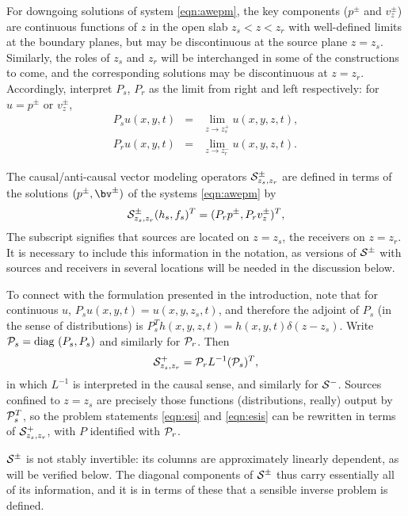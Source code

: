For downgoing solutions of system \ref{eqn:awepm}, the key
components ($p^{\pm}$ and $v^{\pm}_z$) are continuous functions of $z$
in the open slab $z_s<z<z_r$ with well-defined limits at the boundary
planes, but may be discontinuous at the source plane
$z=z_s$. Similarly, the roles of $z_s$ and $z_r$ will be interchanged
in some of the constructions to come, and the corresponding solutions
may be discontinuous at $z=z_r$. Accordingly, interpret $P_s$, $P_r$
as the limit from right and left respectively: for $u=p^{\pm}$ or
$v^{\pm}_z$,
\begin{eqnarray}
  \label{eqn:defsamp}
  P_su(x,y,t) &=& \lim_{z \rightarrow z_s^+} u(x,y,z,t),\nonumber \\
  P_ru(x,y,t) &=& \lim_{z \rightarrow z_r^-} u(x,y,z,t).                  
\end{eqnarray}


The causal/anti-causal vector
modeling operators ${\cal S}^{\pm}_{z_s,z_r}$ are defined in terms of
the solutions $(p^{\pm},\bv^{\pm})$ of the systems \ref{eqn:awepm} by
\begin{equation}
  {\cal S}^{\pm}_{z_s,z_r}(h_s,f_s)^T  = (P_rp^{\pm},P_r v_z^{\pm})^T,
  \label{eqn:fwd}
\end{equation}
The subscript signifies that sources are located on $z=z_s$, the
receivers on $z=z_r$. It is necessary to include this information in
the notation, as versions of ${\cal S}^{\pm}$ with sources and receivers in
several locations will be needed in the discussion below.

 To connect with the formulation presented in
the introduction, note that for continuous $u$,
$P_su(x,y,t)=u(x,y,z_s,t)$, and therefore the adjoint of $P_s$ (in the
sense of distributions) is $P_s^Th(x,y,z,t) =
h(x,y,t)\delta(z-z_s)$. Write ${\cal P}_s = \mbox{diag }(P_s,P_s)$ and
similarly for ${\cal P}_r$. Then
\[
  {\cal S}^{+}_{z_s,z_r} = {\cal P}_r L^{-1}({\cal P}_s)^T,
\]
in which $L^{-1}$ is interpreted in the causal sense, and similarly
for ${\cal S}^{-}$. Sources confined to $z=z_s$ are precisely those
functions (distributions, really) output by ${\cal P}_s^T$, so the
problem statements \ref{eqn:esi} and \ref{eqn:esis} can be rewritten
in terms of ${\cal S}^+_{z_s,z_r}$, with $P$ identified with ${\cal P}_r$.

${\cal S}^{\pm}$ is not stably invertible: its columns are
approximately linearly dependent, as will be verified below. The
diagonal components of ${\cal S}^{\pm}$ thus carry essentially all of
its information, and it is in terms of these that a sensible inverse problem
is defined.

